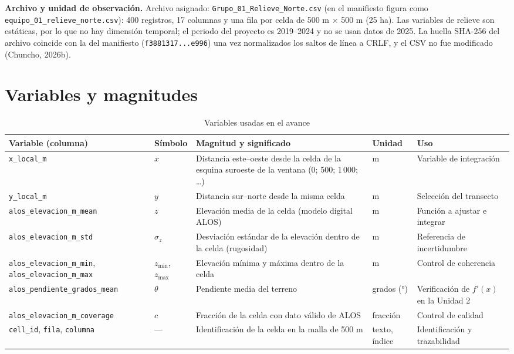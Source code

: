 \documentclass[11pt,a4paper]{article}
\begin{document}
\textbf{Archivo y unidad de observación.} Archivo asignado: \texttt{Grupo\_01\_Relieve\_Norte.csv} (en el manifiesto figura como \texttt{equipo\_01\_relieve\_norte.csv}): 400 registros, 17 columnas y una fila por celda de 500 m $\times$ 500 m (25 ha). Las variables de relieve son estáticas, por lo que no hay dimensión temporal; el periodo del proyecto es 2019--2024 y no se usan datos de 2025. La huella SHA-256 del archivo coincide con la del manifiesto (\texttt{f3881317...e996}) una vez normalizados los saltos de línea a CRLF, y el CSV no fue modificado (Chuncho, 2026b).

\section{Variables y magnitudes}
\begin{table}[h]
\centering
\caption{Variables usadas en el avance}
\small
\begin{tabularx}{\linewidth}{L{3.7cm} L{1.4cm} Y L{1.5cm} L{2.2cm}}
\toprule
\textbf{Variable (columna)} & \textbf{Símbolo} & \textbf{Magnitud y significado} & \textbf{Unidad} & \textbf{Uso}\\
\midrule
\texttt{x\_local\_m} & $x$ & Distancia este--oeste desde la celda de la esquina suroeste de la ventana (0; 500; 1\,000; \dots) & m & Variable de integración\\
\texttt{y\_local\_m} & $y$ & Distancia sur--norte desde la misma celda & m & Selección del transecto\\
\texttt{alos\_elevacion\_m\_mean} & $z$ & Elevación media de la celda (modelo digital ALOS) & m & Función a ajustar e integrar\\
\texttt{alos\_elevacion\_m\_std} & $\sigma_z$ & Desviación estándar de la elevación dentro de la celda (rugosidad) & m & Referencia de incertidumbre\\
\texttt{alos\_elevacion\_m\_min}, \texttt{alos\_elevacion\_m\_max} & $z_{\min}$, $z_{\max}$ & Elevación mínima y máxima dentro de la celda & m & Control de coherencia\\
\texttt{alos\_pendiente\_grados\_mean} & $\theta$ & Pendiente media del terreno & grados (°) & Verificación de $f'(x)$ en la Unidad 2\\
\texttt{alos\_elevacion\_m\_coverage} & $c$ & Fracción de la celda con dato válido de ALOS & fracción & Control de calidad\\
\texttt{cell\_id}, \texttt{fila}, \texttt{columna} & --- & Identificación de la celda en la malla de 500 m & texto, índice & Identificación y trazabilidad\\
\bottomrule
\end{tabularx}
\end{table}
\end{document}
